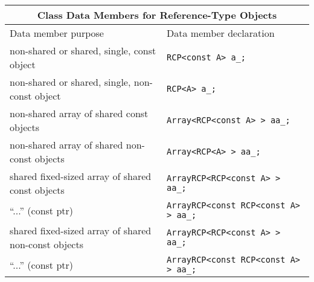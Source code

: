 \begin{tabular}{|l|l|}
%
\multicolumn{2}{c}{\textbf{Class Data Members for Reference-Type Objects}} \\
%
\hline
Data member purpose
& Data member declaration \\
\hline
\hline
non-shared or shared, single, const object
& {}\texttt{RCP<const A> a\_;} \\
\hline
non-shared or shared, single, non-const object
& {}\texttt{RCP<A> a\_;} \\
\hline
non-shared array of shared const objects
& {}\texttt{Array<RCP<const A> > aa\_;} \\
\hline
non-shared array of shared non-const objects
& {}\texttt{Array<RCP<A> > aa\_;} \\
\hline
shared fixed-sized array of shared const objects
& {}\texttt{ArrayRCP<RCP<const A> > aa\_;} \\
\hline
``...'' (const ptr)
& {}\texttt{ArrayRCP<const RCP<const A> > aa\_;} \\
\hline
shared fixed-sized array of shared non-const objects
& {}\texttt{ArrayRCP<RCP<const A> > aa\_;} \\
\hline
``...'' (const ptr)
& {}\texttt{ArrayRCP<const RCP<const A> > aa\_;} \\
\hline
\end{tabular}
